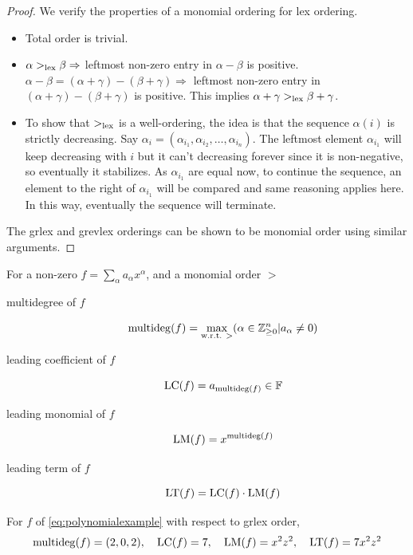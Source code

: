 \documentclass[a4paper,11pt]{article}
\begin{document}
\begin{proof}
    We verify the properties of a monomial ordering for lex ordering.
    \begin{itemize}
        \item Total order is trivial.
        \item $\alpha>_{\text{lex}}\beta\Rightarrow$ leftmost non-zero entry in $\alpha-\beta$ is positive. $\alpha-\beta = (\alpha+\gamma)-(\beta+\gamma)\Rightarrow$ leftmost non-zero entry in $(\alpha+\gamma)-(\beta+\gamma)$ is positive. This implies $\alpha+\gamma>_{\text{lex}}\beta+\gamma$.
        \item To show that $>_{\text{lex}}$ is a well-ordering, the idea is that the sequence ${\alpha(i)}$ is strictly decreasing. Say $\alpha_i = (\alpha_{i_1}, \alpha_{i_2}, \ldots, \alpha_{i_n})$. The leftmost element $\alpha_{i_1}$ will keep decreasing with $i$ but it can't decreasing forever since it is non-negative, so eventually it stabilizes. As $\alpha_{i_1}$ are equal now, to continue the sequence, an element to the right of $\alpha_{i_1}$ will be compared and same reasoning applies here. In this way, eventually the sequence will terminate.
    \end{itemize}
The grlex and grevlex orderings can be shown to be monomial order using similar arguments.
\end{proof}
\begin{defn}
    For a non-zero $f=\sum_\alpha a_\alpha x^\alpha$, and a monomial order $>$
    \begin{description}
        \item[multidegree of $f$]
        \begin{equation}
            \operatorname{multideg}(f)=\max_{\text{w.r.t. $>$}}(\alpha\in\mathbb{Z}^n_{\geq0} | a_\alpha \neq0)
        \end{equation}
        \item[leading coefficient of $f$]
        \begin{equation}
            \operatorname{LC}(f)= a_{\operatorname{multideg}(f)} \in \mathbb{F}
        \end{equation}
        \item[leading monomial of $f$]
        \begin{equation}
            \operatorname{LM}(f)= x^{\operatorname{multideg}(f)}
        \end{equation}
        \item[leading term of $f$]
        \begin{equation}
            \operatorname{LT}(f)= \operatorname{LC}(f)\cdot \operatorname{LM}(f) 
        \end{equation}
    \end{description}
    For $f$ of \ref{eq:polynomialexample} with respect to grlex order,
    \begin{equation}
        \operatorname{multideg}(f)=(2,0,2),\quad \operatorname{LC}(f)=7,\quad \operatorname{LM}(f)=x^2z^2,\quad \operatorname{LT}(f)=7x^2z^2
    \end{equation}
\end{defn}
\end{document}
